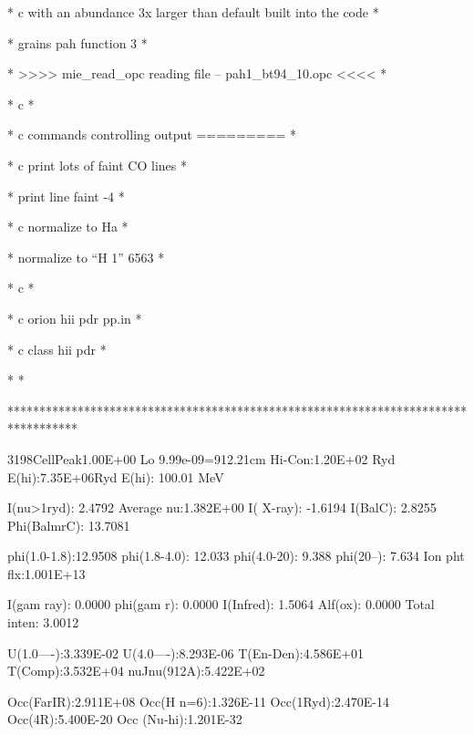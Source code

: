 {                       * c with an abundance 3x larger than default built
into the code                  *

                       * grains pah function 3                         
*

                       * >>>> mie_read_opc reading file --
pah1_bt94_10.opc                         <<<< *

                       * c                                             
*

                       * c commands controlling output    =========    
*

                       * c print lots of faint CO lines                
*

                       * print line faint -4                           
*

                       * c normalize to Ha                             
*

                       * normalize to ``H  1'' 6563                    
*

                       * c                                             
*

                       * c orion hii pdr pp.in                         
*

                       * c class hii pdr                               
*

                       *                                               
*

                      
***********************************************************************************


           3198CellPeak1.00E+00   Lo 9.99e-09=912.21cm   Hi-Con:1.20E+02
Ryd   E(hi):7.35E+06Ryd     E(hi):     100.01 MeV

           I(nu>1ryd):   2.4792   Average nu:1.382E+00   I( X-ray):  -1.6194
I(BalC):   2.8255     Phi(BalmrC):  13.7081

           phi(1.0-1.8):12.9508   phi(1.8-4.0): 12.033   phi(4.0-20):  9.388
phi(20--):  7.634     Ion pht flx:1.001E+13

           I(gam ray):   0.0000   phi(gam r):   0.0000   I(Infred):   1.5064
Alf(ox):   0.0000     Total inten:   3.0012

           U(1.0----):3.339E-02   U(4.0----):8.293E-06
T(En-Den):4.586E+01   T(Comp):3.532E+04     nuJnu(912A):5.422E+02

           Occ(FarIR):2.911E+08   Occ(H n=6):1.326E-11   Occ(1Ryd):2.470E-14
Occ(4R):5.400E-20     Occ (Nu-hi):1.201E-32

}
